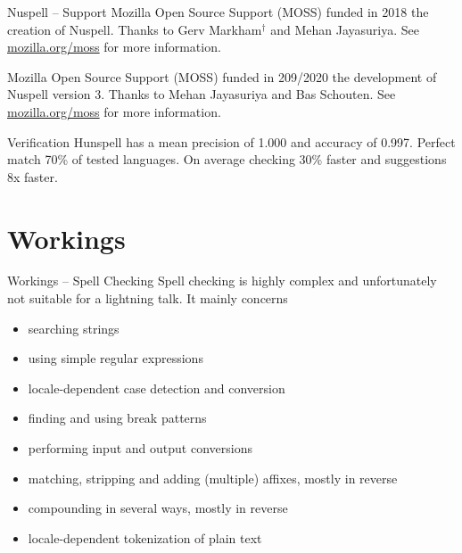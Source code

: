 \documentclass{beamer}
\begin{document}
\begin{frame}{Nuspell – Support}
Mozilla Open Source Support (MOSS) funded in 2018 the creation of Nuspell. Thanks to Gerv Markham$^†$ and Mehan Jayasuriya. See \href{https://mozilla.org/moss}{mozilla.org/moss} for more information.

Mozilla Open Source Support (MOSS) funded in 209/2020 the development of Nuspell version 3. Thanks to Mehan Jayasuriya and Bas Schouten. See \href{https://mozilla.org/moss}{mozilla.org/moss} for more information.


\begin{figure}
\centering
\def\svgwidth{.75\columnwidth}

\end{figure}
Verification Hunspell has a mean precision of 1.000 and accuracy of 0.997. Perfect match 70\% of tested languages. On average checking 30\% faster and suggestions 8x faster.
\end{frame}



\section{Workings}

\begin{frame}{Workings – Spell Checking}
Spell checking is \alert{highly complex} and unfortunately not suitable for a lightning talk. It mainly concerns
\begin{itemize}
\item searching strings
\item using simple regular expressions
\item locale-dependent case detection and conversion
\item finding and using break patterns
\item performing input and output conversions
\item matching, stripping and adding (multiple) affixes, mostly in reverse
\item compounding in several ways, mostly in reverse
\item locale-dependent tokenization of plain text
\end{itemize}
\end{frame}
\end{document}
